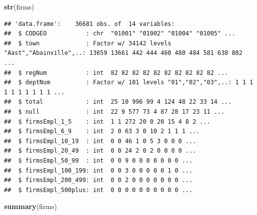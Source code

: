 \documentclass[]{article}
\newenvironment{Shaded}{\begin{snugshade}}{\end{snugshade}}
\newcommand{\KeywordTok}[1]{\textcolor[rgb]{0.13,0.29,0.53}{\textbf{#1}}}
\newcommand{\NormalTok}[1]{#1}
\begin{document}
\begin{Shaded}
\begin{Highlighting}[]
\KeywordTok{str}\NormalTok{(firms)}
\end{Highlighting}
\end{Shaded}

\begin{verbatim}
## 'data.frame':    36681 obs. of  14 variables:
##  $ CODGEO           : chr  "01001" "01002" "01004" "01005" ...
##  $ town             : Factor w/ 34142 levels "Aast","Abainville",..: 13659 13661 442 444 460 480 484 581 638 802 ...
##  $ regNum           : int  82 82 82 82 82 82 82 82 82 82 ...
##  $ deptNum          : Factor w/ 101 levels "01","02","03",..: 1 1 1 1 1 1 1 1 1 1 ...
##  $ total            : int  25 10 996 99 4 124 48 22 33 14 ...
##  $ null             : int  22 9 577 73 4 87 28 17 23 11 ...
##  $ firmsEmpl_1_5    : int  1 1 272 20 0 20 15 4 8 2 ...
##  $ firmsEmpl_6_9    : int  2 0 63 3 0 10 2 1 1 1 ...
##  $ firmsEmpl_10_19  : int  0 0 46 1 0 5 3 0 0 0 ...
##  $ firmsEmpl_20_49  : int  0 0 24 2 0 2 0 0 0 0 ...
##  $ firmsEmpl_50_99  : int  0 0 9 0 0 0 0 0 0 0 ...
##  $ firmsEmpl_100_199: int  0 0 3 0 0 0 0 0 1 0 ...
##  $ firmsEmpl_200_499: int  0 0 2 0 0 0 0 0 0 0 ...
##  $ firmsEmpl_500plus: int  0 0 0 0 0 0 0 0 0 0 ...
\end{verbatim}

\begin{Shaded}
\begin{Highlighting}[]
\KeywordTok{summary}\NormalTok{(firms)}
\end{Highlighting}
\end{Shaded}
\end{document}
